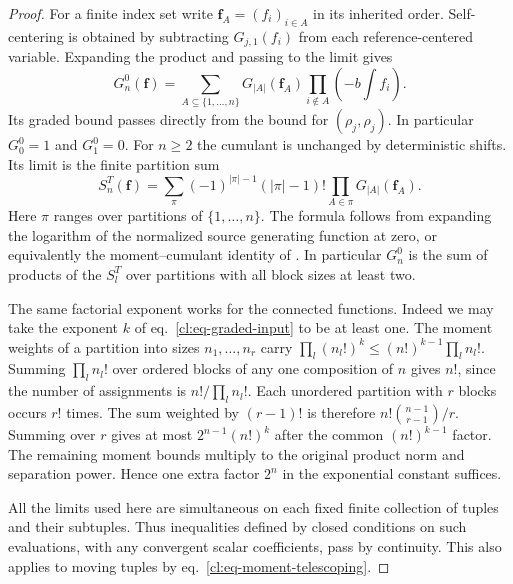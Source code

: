 \documentclass[11pt,letterpaper,reqno]{amsart}
\numberwithin{equation}{section}
\renewcommand{\eqref}[1]{\textup{eq.~\ref{#1}}}
\theoremstyle{definition}
\theoremstyle{remark}
\begin{document}
\begin{proof}
For a finite index set write \(\mathbf f_A=(f_i)_{i\in A}\) in
its inherited order. Self-centering is obtained by subtracting
\(G_{j,1}(f_i)\) from each reference-centered variable. Expanding
the product and passing to the limit gives
\begin{equation}\label{cl:eq-self-centered-moments}
 G_n^0(\mathbf f)
  =\sum_{A\subseteq\{1,\ldots,n\}}G_{|A|}(\mathbf f_A)
                \prod_{i\notin A}\left(-b\int f_i\right).
\end{equation}
Its graded bound passes directly from the bound for
\((\rho_j,\rho_j)\). In particular \(G_0^0=1\) and \(G_1^0=0\).
For \(n\ge2\) the cumulant is unchanged by deterministic shifts.
Its limit is the finite partition sum
\begin{equation}\label{cl:eq-separated-connected}
 S_n^T(\mathbf f)=
 \sum_{\pi}(-1)^{|\pi|-1}(|\pi|-1)!
        \prod_{A\in\pi}G_{|A|}(\mathbf f_A).
\end{equation}
Here \(\pi\) ranges over partitions of \(\{1,\ldots,n\}\).
The formula follows from expanding the logarithm of the normalized
source generating function at zero, or equivalently the
moment--cumulant identity of \cite[Lemma~2.1]{SI}.
In particular \(G_n^0\) is the sum of products of the \(S_l^T\)
over partitions with all block sizes at least two.

The same factorial exponent works for the connected functions.
Indeed we may take the exponent \(k\) of
\eqref{cl:eq-graded-input} to be at least one. The moment
weights of a partition into sizes \(n_1,\ldots,n_r\) carry
\(\prod_l(n_l!)^k\le (n!)^{k-1}\prod_l n_l!\).
Summing \(\prod_l n_l!\) over ordered blocks of any one composition
of \(n\) gives \(n!\), since the number of assignments is
\(n!/\prod_l n_l!\). Each unordered partition with \(r\) blocks
occurs \(r!\) times. The sum weighted by \((r-1)!\) is therefore
\(n!\binom{n-1}{r-1}/r\). Summing over \(r\) gives at most
\(2^{n-1}(n!)^k\) after the common \((n!)^{k-1}\) factor.
The remaining moment bounds multiply to the original product
norm and separation power. Hence one extra factor \(2^n\) in
the exponential constant suffices.

All the limits used here are simultaneous on each fixed finite
collection of tuples and their subtuples. Thus inequalities
defined by closed conditions on such evaluations, with any
convergent scalar coefficients, pass by continuity. This also
applies to moving tuples by \eqref{cl:eq-moment-telescoping}.
\end{proof}
\end{document}

